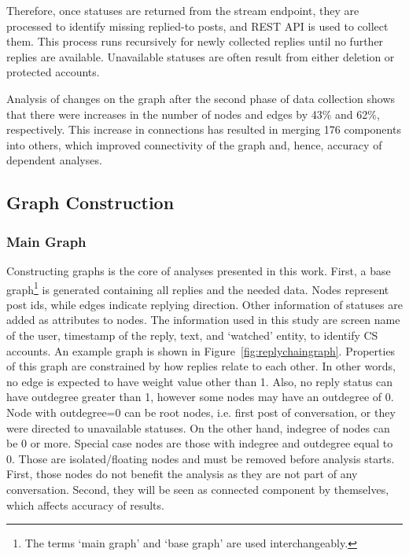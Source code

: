 \documentclass[sigconf]{acmart}
\begin{document}
Therefore, once statuses are returned from the stream endpoint, they
are processed to identify missing replied-to posts, and REST API is
used to collect them. This process runs recursively for newly
collected replies until no further replies are available. Unavailable
statuses are often result from either deletion or protected accounts.

Analysis of changes on the graph after the second phase of data
collection shows that there were increases in the number of nodes and
edges by 43\% and 62\%, respectively. This increase in connections has
resulted in merging 176 components into others, which improved
connectivity of the graph and, hence, accuracy of dependent analyses.



\subsection{Graph Construction}

\subsubsection{Main Graph}

Constructing graphs is the core of analyses presented in this work. 
First, a base graph\footnote{The terms `main graph' and `base graph' are 
used interchangeably.} is generated containing all replies and the needed data. 
Nodes represent post ids, while edges indicate replying direction. Other 
information of statuses are added as attributes to nodes. The information used in
this study are screen name of the user, timestamp of the reply, text,
and `watched' entity, to identify CS accounts. An example graph is
shown in Figure~\ref{fig:replychaingraph}. Properties of this graph
are constrained by how replies relate to each other. In other words,
no edge is expected to have weight value other than 1. Also, no reply
status can have outdegree greater than 1, however some nodes may have
an outdegree of 0. Node with outdegree=0 can be root nodes, i.e. first
post of conversation, or they were directed to unavailable
statuses. On the other hand, indegree of nodes can be 0 or
more. Special case nodes are those with indegree and outdegree equal
to 0. Those are isolated/floating nodes and must be removed before
analysis starts. First, those nodes do not benefit the analysis as
they are not part of any conversation. Second, they will be seen as
connected component by themselves, which affects accuracy of results.
\end{document}
